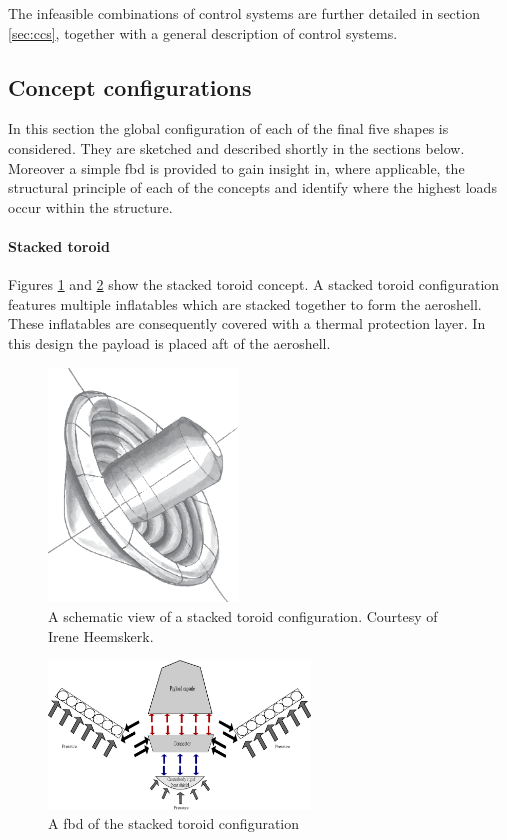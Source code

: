  The infeasible combinations of control systems are further detailed in section \ref{sec:ccs}, together with a general description of control systems. 

\subsection{Concept configurations} \label{sec:conf}
In this section the global configuration of each of the final five shapes is considered. They are sketched and described shortly in the sections below. Moreover a simple \gls{fbd} is provided to gain insight in, where applicable, the structural principle of each of the concepts and identify where the highest loads occur within the structure.

\paragraph{Stacked toroid}

Figures \ref{fig:conc_stacked} and \ref{fig:fbd_stacked} show the stacked toroid concept. A stacked toroid configuration features multiple inflatables which are stacked together to form the aeroshell. These inflatables are consequently covered with a thermal protection layer. In this design the payload is placed aft of the aeroshell.

\begin{figure}[H]
\centering
\includegraphics[width = 0.45\textwidth]{Figure/stacked_toroid.eps}
\caption{A schematic view of a stacked toroid configuration. Courtesy of Irene Heemskerk.}
\label{fig:conc_stacked}
\end{figure}

\begin{figure}[H]
\centering
\includegraphics[width = 0.62\textwidth]{Figure/FBD_stacked.eps}
\caption{A \gls{fbd} of the stacked toroid configuration}
\label{fig:fbd_stacked}
\end{figure}


